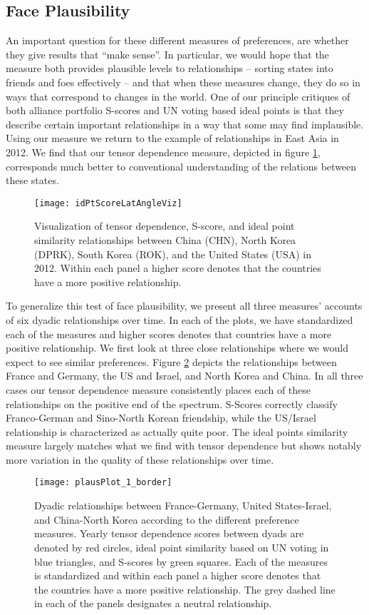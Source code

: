 \subsection*{Face Plausibility}

An important question for these different measures of preferences, are whether they give results that ``make sense''. In particular, we would hope that the measure both provides plausible levels to relationships -- sorting states into friends and foes effectively -- and that when these measures change, they do so in ways that correspond to changes in the world. One of our principle critiques of both alliance portfolio S-scores and UN voting based ideal points is that they describe certain important relationships in a way that some may find implausible. Using our measure we return to the example of relationships in East Asia in 2012. We find that our tensor dependence measure, depicted in figure \ref{korea:withus}, corresponds much better to conventional understanding of the relations between these states.

\begin{figure}[ht]
\texttt{[image: idPtScoreLatAngleViz]}
\caption{Visualization of tensor dependence, S-score, and ideal point similarity relationships between China (CHN), North Korea (DPRK), South Korea (ROK), and the United States (USA) in 2012. Within each panel a higher score denotes that the countries have a more positive relationship.}
\label{korea:withus}
\end{figure}

To generalize this test of face plausibility, we present all three measures' accounts of six dyadic relationships over time. In each of the plots, we have standardized each of the measures and higher scores denotes that countries have a more positive relationship. We first look at three close relationships where we would expect to see similar preferences. Figure \ref{friendly:dyads} depicts the relationships between France and Germany, the US and Israel, and North Korea and China. In all three cases our tensor dependence measure consistently places each of these relationships on the positive end of the spectrum. S-Scores correctly classify Franco-German and Sino-North Korean friendship, while the US/Israel relationship is characterized as actually quite poor. The ideal points similarity measure largely matches what we find with tensor dependence but shows notably more variation in the quality of these relationships over time.

\begin{figure}
	\centering
	\texttt{[image: plausPlot\_1\_border]}
	\caption{Dyadic relationships between France-Germany, United States-Israel, and China-North Korea according to the different preference measures. Yearly tensor dependence scores between dyads are denoted by red circles, ideal point similarity based on UN voting in blue triangles, and S-scores by green squares. Each of the measures is standardized and within each panel a higher score denotes that the countries have a more positive relationship. The grey dashed line in each of the panels designates a neutral relationship.}
	\label{friendly:dyads}
\end{figure}

